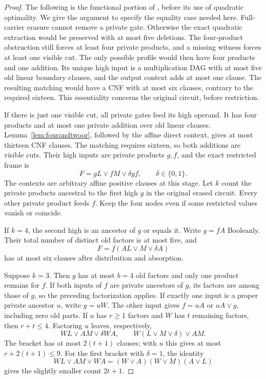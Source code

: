 \begin{proof}
The following is the functional portion of \citet[proof of Lemma~5.35]{Companion}, before its use of quadratic optimality. We give the argument to specify the equality case needed here. Full-carrier erasure cannot remove a private gate. Otherwise the exact quadratic extraction would be preserved with at most five deletions. The four-product obstruction still forces at least four private products, and a missing witness forces at least one visible cut. The only possible profile would then have four products and one addition. Its unique high input is a multiplication DAG with at most five old linear boundary clauses, and the output context adds at most one clause. The resulting matching would have a CNF with at most six clauses, contrary to the required sixteen. This essentiality concerns the original circuit, before restriction.

If there is just one visible cut, all private gates feed its high operand. It has four products and at most one private addition over old linear clauses. Lemma~\ref{lem:fourandtwoor}, followed by the affine direct context, gives at most thirteen CNF clauses. The matching requires sixteen, so both additions are visible cuts. Their high inputs are private products $g,f$, and the exact restricted frame is
\[
 F=gL\vee fM\vee\delta gf,\qquad\delta\in\{0,1\}.
\]
The contexts are arbitrary affine positive clauses at this stage. Let $k$ count the private products ancestral to the first high $g$ in the original erased circuit. Every other private product feeds $f$. Keep the four nodes even if some restricted values vanish or coincide.

If $k=4$, the second high is an ancestor of $g$ or equals it. Write $g=fA$ Booleanly. Their total number of distinct old factors is at most five, and
\[
 F=f(AL\vee M\vee\delta A)
\]
has at most six clauses after distribution and absorption.

Suppose $k=3$. Then $g$ has at most $b=4$ old factors and only one product remains for $f$. If both inputs of $f$ are private ancestors of $g$, its factors are among those of $g$, so the preceding factorization applies. If exactly one input is a proper private ancestor $u$, write $g=uW$. The other input gives $f=uA$ or $uA\vee g$, including zero old parts. If $u$ has $r\ge1$ factors and $W$ has $t$ remaining factors, then $r+t\le4$. Factoring $u$ leaves, respectively,
\[
 WL\vee AM\vee\delta WA,
 \qquad W(L\vee M\vee\delta)\vee AM.
\]
The bracket has at most $2(t+1)$ clauses; with $u$ this gives at most $r+2(t+1)\le9$. For the first bracket with $\delta=1$, the identity
\[
 WL\vee AM\vee WA=(W\vee A)(W\vee M)(A\vee L)
\]
gives the slightly smaller count $2t+1$.


\end{proof}
